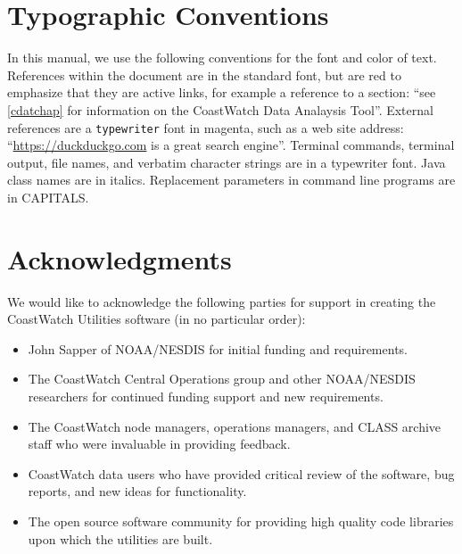 \section*{Typographic Conventions}

In this manual, we use the following conventions for the font and
color of text.  References within the document are in the
standard font, but are red to emphasize that they are active
links, for example a reference to a section: ``see
\autoref{cdatchap} for information on the CoastWatch Data
Analaysis Tool''.  External references are a {\tt typewriter}
font in magenta, such as a web site address:
``\url{https://duckduckgo.com} is a great search engine''.
Terminal commands, terminal output, file names, and verbatim
character strings are in a {\file typewriter} font.  Java class
names are in {\java italics}.  Replacement parameters in command
line programs are in CAPITALS.

\section*{Acknowledgments}

We would like to acknowledge the following parties for support in
creating the CoastWatch Utilities software (in no particular
order):
\begin{itemize}

  \item John Sapper of NOAA/NESDIS for initial funding and requirements.

  \item The CoastWatch Central Operations group and other 
  NOAA/NESDIS researchers for continued funding support and new requirements.

  \item The CoastWatch node managers, operations managers, and
  CLASS archive staff who were invaluable in providing feedback.

  \item CoastWatch data users who have provided critical review
  of the software, bug reports, and new ideas for functionality.

  \item The open source software community for providing high
  quality code libraries upon which the utilities are built.

\end{itemize}
